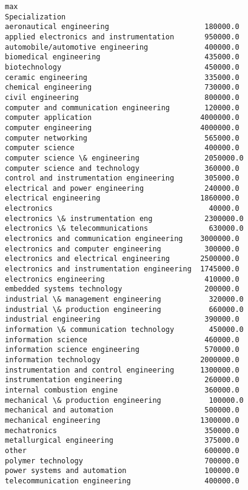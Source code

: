 \documentclass[11pt]{article}
\begin{document}
\begin{tcolorbox}[breakable, size=fbox, boxrule=.5pt, pad at break*=1mm, opacityfill=0]
\begin{Verbatim}[commandchars=\\\{\}]
                                                   max
Specialization
aeronautical engineering                      180000.0
applied electronics and instrumentation       950000.0
automobile/automotive engineering             400000.0
biomedical engineering                        435000.0
biotechnology                                 450000.0
ceramic engineering                           335000.0
chemical engineering                          730000.0
civil engineering                             800000.0
computer and communication engineering        120000.0
computer application                         4000000.0
computer engineering                         4000000.0
computer networking                           565000.0
computer science                              400000.0
computer science \& engineering               2050000.0
computer science and technology               360000.0
control and instrumentation engineering       305000.0
electrical and power engineering              240000.0
electrical engineering                       1860000.0
electronics                                    40000.0
electronics \& instrumentation eng            2300000.0
electronics \& telecommunications              630000.0
electronics and communication engineering    3000000.0
electronics and computer engineering          300000.0
electronics and electrical engineering       2500000.0
electronics and instrumentation engineering  1745000.0
electronics engineering                       410000.0
embedded systems technology                   200000.0
industrial \& management engineering           320000.0
industrial \& production engineering           660000.0
industrial engineering                        390000.0
information \& communication technology        450000.0
information science                           460000.0
information science engineering               570000.0
information technology                       2000000.0
instrumentation and control engineering      1300000.0
instrumentation engineering                   260000.0
internal combustion engine                    360000.0
mechanical \& production engineering           100000.0
mechanical and automation                     500000.0
mechanical engineering                       1300000.0
mechatronics                                  350000.0
metallurgical engineering                     375000.0
other                                         600000.0
polymer technology                            700000.0
power systems and automation                  100000.0
telecommunication engineering                 400000.0
\end{Verbatim}
\end{tcolorbox}
        
\end{document}
